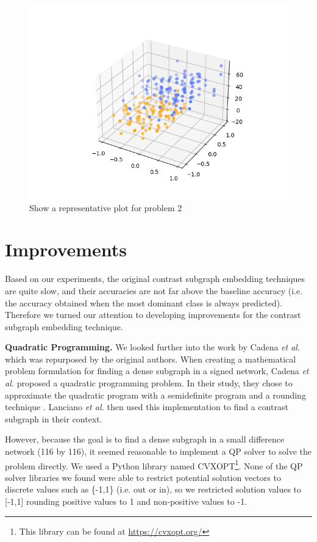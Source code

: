 \documentclass[letterpaper]{article}
\begin{document}
\begin{figure}
    \centering
    \includegraphics[width=\columnwidth, keepaspectratio=true]{test.png}
    \caption{Show a representative plot for problem 2}
    \label{fig:prob2}
\end{figure}




\section{Improvements} \label{improvements}

Based on our experiments, the original contrast subgraph embedding techniques are quite slow, and their accuracies are not far above the baseline accuracy (i.e. the accuracy obtained when the most dominant class is always predicted).
Therefore we turned our attention to developing improvements for the contrast subgraph embedding technique.

\textbf{Quadratic Programming.}
We looked further into the work by Cadena \emph{et al.} which was repurposed by the original authors.
When creating a mathematical problem formulation for finding a dense subgraph in a signed network, Cadena \emph{et al.} proposed a quadratic programming problem.
In their study, they chose to approximate the quadratic program with a semidefinite program and a rounding technique \cite{cadena2016}.
Lanciano \emph{et al.} then used this implementation to find a contrast subgraph in their context.

However, because the goal is to find a dense subgraph in a small difference network (116 by 116), it seemed reasonable to implement a QP solver to solve the problem directly.
We used a Python library named CVXOPT\footnote{This library can be found at \url{https://cvxopt.org/}}.
None of the QP solver libraries we found were able to restrict potential solution vectors to discrete values such as \{-1,1\} (i.e. out or in), so we restricted solution values to [-1,1] rounding positive values to 1 and non-positive values to -1.
\end{document}
